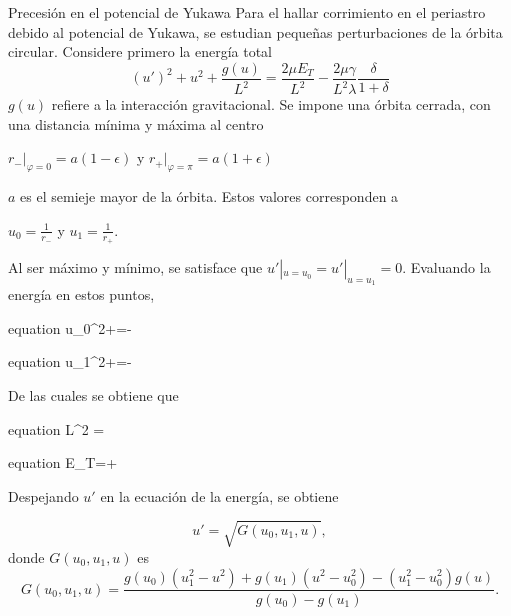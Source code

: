 \documentclass{beamer}
\begin{document}
	\begin{frame}[allowframebreaks]{Precesión en el potencial de Yukawa}
	\justifying
	Para el hallar corrimiento en el periastro debido al potencial de Yukawa, se estudian pequeñas perturbaciones de la órbita circular. Considere primero la energía total
	\begin{equation}
		(u')^2+u^2+\frac{g(u)}{L^2}=\frac{2\mu E_T}{L^2}-\frac{2\mu\gamma}{L^2\lambda}\frac{\delta}{1+\delta}
	\end{equation}
	$g(u)$ refiere a la interacción gravitacional. Se impone una órbita cerrada, con una distancia mínima y máxima al centro
	
	\begin{center}
	$r_-|_{\varphi=0}=a(1-\epsilon)$ y $r_+|_{\varphi=\pi}=a(1+\epsilon)$
	\end{center}
	$a$ es el semieje mayor de la órbita. Estos valores corresponden a 
	
	\begin{center}
		$u_0=\frac{1}{r_-}$ y $u_1=\frac{1}{r_+}$.
	\end{center}

	Al ser máximo y mínimo, se satisface que $u'|_{u=u_0}=u'|_{u=u_1}=0$. Evaluando la energía en estos puntos,
	
	\begin{empheq}[box=\tcbhighmath]{equation}
		u_0^2+=-
	\end{empheq}
	\begin{empheq}[box=\tcbhighmath]{equation}
	u_1^2+=-
	\end{empheq}
	De las cuales se obtiene que
	
	\begin{empheq}[box=\tcbhighmath]{equation}
	L^2 =
	\end{empheq}
	
	\begin{empheq}[box=\tcbhighmath]{equation}
	E_T=+\frac{\gamma}{\lambda}
	\end{empheq}
	Despejando $u'$ en la ecuación de la energía, se obtiene
	
	\begin{equation}
		u'=\sqrt{G(u_0,u_1,u)},
	\end{equation}
	donde $G(u_0,u_1,u)$ es
	\begin{equation}
		G(u_0,u_1,u)=\frac{g(u_0)(u_1^2-u^2)+g(u_1)(u^2-u_0^2)-(u_1^2-u_0^2)g(u)}{g(u_0)-g(u_1)}.
	\end{equation}
	

\end{frame}
\end{document}
